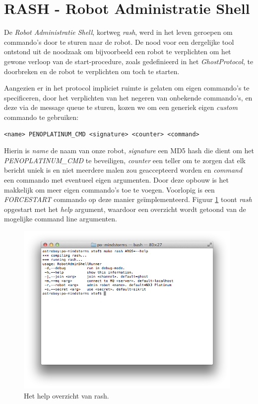 \documentclass[12pt,a4paper]{report}
\begin{document}
\section{RASH - Robot Administratie Shell}

De \emph{Robot Administratie Shell}, kortweg \emph{rash}, werd in het leven geroepen om commando's door te sturen naar de robot. De nood voor een dergelijke tool ontstond uit de noodzaak om bijvoorbeeld een robot te verplichten om het gewone verloop van de start-procedure, zoals gedefinieerd in het \emph{GhostProtocol}, te doorbreken en de robot te verplichten om toch te starten.

Aangezien er in het protocol impliciet ruimte is gelaten om eigen commando's te specificeren, door het verplichten van het negeren van onbekende commando's, en deze via de message queue te sturen, kozen we om een generiek eigen \emph{custom} commando te gebruiken:

\begin{center}
{\tt <name> PENOPLATINUM\_CMD <signature> <counter> <command>}
\end{center}

Hierin is \emph{name} de naam van onze robot, \emph{signature} een MD5 hash die dient om het \emph{PENOPLATINUM\_CMD} te beveiligen, \emph{counter} een teller om te zorgen dat elk bericht uniek is en niet meerdere malen zou geaccepteerd worden en \emph{command} een commando met eventueel eigen argumenten. Door deze opbouw is het makkelijk om meer eigen commando's toe te voegen. Voorlopig is een \emph{FORCESTART} commando op deze manier ge\"implementeerd. Figuur \ref{fig:rash_help} toont \emph{rash} opgestart met het \emph{help} argument, waardoor een overzicht wordt getoond van de mogelijke command line argumenten. 

\begin{figure}[htbp]
  \centering
  \includegraphics[width=110mm]{resources/rash_help.png}
  \caption{Het help overzicht van rash.}
  \label{fig:rash_help}
\end{figure}
\end{document}
